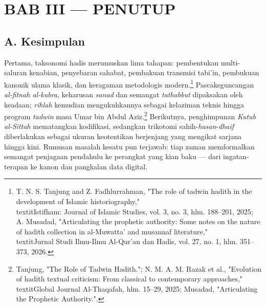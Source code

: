 
\section*{BAB III --- PENUTUP}

\subsection*{A. Kesimpulan}

Pertama, taksonomi hadis merumuskan lima tahapan: pembentukan multi-saluran kenabian, penyebaran sahabat, pembakuan transmisi tabi'in, pembukuan kanonik ulama klasik, dan keragaman metodologis modern.\footnote{T. N. S. Tanjung and Z. Fadhlurrahman, "The role of tadwin hadith in the development of Islamic historiography," \\textit{Istifham: Journal of Islamic Studies}, vol. 3, no. 3, hlm. 188--201, 2025; A. Musadad, "Articulating the prophetic authority: Some notes on the nature of hadith collection in al-Muwatta' and musannaf literature," \\textit{Jurnal Studi Ilmu-Ilmu Al-Qur'an dan Hadis}, vol. 27, no. 1, hlm. 351--373, 2026.} Pascakeguncangan \textit{al-fitnah al-kubra}, keharusan \textit{sanad} dan semangat \textit{tathabbut} dipaksakan oleh keadaan; \textit{rihlah} kemudian mengukuhkannya sebagai kelaziman teknis hingga program \textit{tadwin} masa Umar bin Abdul Aziz.\footnote{Tanjung, "The Role of Tadwin Hadith."; N. M. A. M. Razak et al., "Evolution of hadith textual criticism: From classical to contemporary approaches," \\textit{Global Journal Al-Thaqafah}, hlm. 15--29, 2025; Musadad, "Articulating the Prophetic Authority.".} Berikutnya, penghimpunan \textit{Kutub al-Sittah} mematangkan kodifikasi, sedangkan trikotomi sahih-\textit{hasan}-\textit{dhaif} diberlakukan sebagai ukuran keotentikan berjenjang yang mengikat sarjana hingga kini. Rumusan masalah kesatu pun terjawab: tiap zaman memformalkan semangat penjagaan pendahulu ke perangkat yang kian baku --- dari ingatan-terapan ke kanon dan pangkalan data digital.

